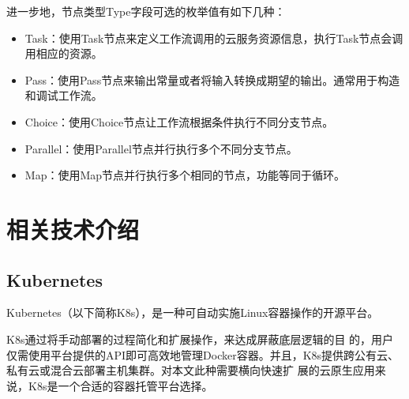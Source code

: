 进一步地，节点类型Type字段可选的枚举值有如下几种：
\begin{itemize}
    \item Task：使用Task节点来定义工作流调用的云服务资源信息，执行Task节点会调用相应的资源。
    \item Pass：使用Pass节点来输出常量或者将输入转换成期望的输出。通常用于构造和调试工作流。
    \item Choice：使用Choice节点让工作流根据条件执行不同分支节点。
    \item Parallel：使用Parallel节点并行执行多个不同分支节点。
    \item Map：使用Map节点并行执行多个相同的节点，功能等同于循环。
\end{itemize}



\section{相关技术介绍}

%
%
%


\subsection{Kubernetes}
Kubernetes（以下简称K8s），是一种可自动实施Linux容器操作的开源平台。

K8s通过将手动部署的过程简化和扩展操作，来达成屏蔽底层逻辑的目
的，用户仅需使用平台提供的API即可高效地管理Docker容器。并且，K8s提供跨公有云、私有云或混合云部署主机集群。对本文此种需要横向快速扩
展的云原生应用来说，K8s是一个合适的容器托管平台选择。

